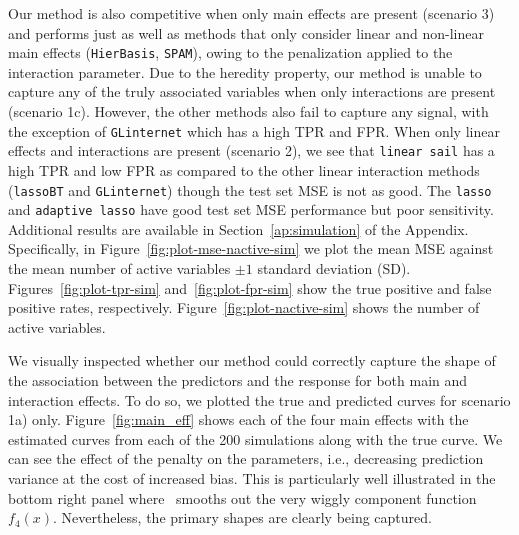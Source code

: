 

Our method is also competitive when only main effects are present (scenario 3) and performs just as well as methods that only consider linear and non-linear main effects (\texttt{HierBasis}, \texttt{SPAM}), owing to the penalization applied to the interaction parameter. Due to the heredity property, our method is unable to capture any of the truly associated variables when only interactions are present (scenario 1c). However, the other methods also fail to capture any signal, with the exception of \texttt{GLinternet} which has a high TPR and FPR. When only linear effects and interactions are present (scenario 2), we see that \texttt{linear sail} has a high TPR and low FPR as compared to the other linear interaction methods (\texttt{lassoBT} and \texttt{GLinternet}) though the test set MSE is not as good. The \texttt{lasso} and \texttt{adaptive lasso} have good test set MSE performance but poor sensitivity. Additional results are available in Section~\ref{ap:simulation} of the Appendix. Specifically, in Figure~\ref{fig:plot-mse-nactive-sim} we plot the mean MSE against the mean number of active variables $\pm 1$ standard deviation (SD). Figures~\ref{fig:plot-tpr-sim} and~\ref{fig:plot-fpr-sim} show the true positive and false positive rates, respectively. Figure~\ref{fig:plot-nactive-sim} shows the number of active variables. 

We visually inspected whether our method could correctly capture the shape of the association between the predictors and the response for both main and interaction effects. To do so, we plotted the true and predicted curves for scenario 1a) only. Figure~\ref{fig:main_eff} shows each of the four main effects with the estimated curves from each of the 200 simulations along with the true curve. We can see the effect of the penalty on the parameters, i.e., decreasing prediction variance at the cost of increased bias. This is particularly well illustrated in the bottom right panel where \sail ~smooths out the very wiggly component function $f_4(x)$. Nevertheless, the primary shapes are clearly being captured.


